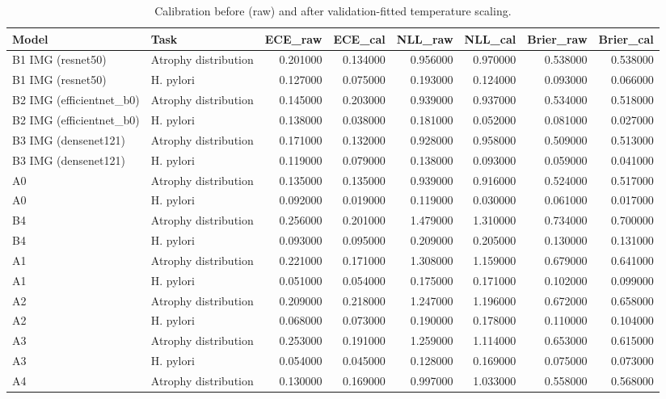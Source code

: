 \begin{table}
\caption{Calibration before (raw) and after validation-fitted temperature scaling.}
\label{tab:table7a_calibration}
\begin{tabular}{llrrrrrr}
\toprule
Model & Task & ECE\_raw & ECE\_cal & NLL\_raw & NLL\_cal & Brier\_raw & Brier\_cal \\
\midrule
B1 IMG (resnet50) & Atrophy distribution & 0.201000 & 0.134000 & 0.956000 & 0.970000 & 0.538000 & 0.538000 \\
B1 IMG (resnet50) & H. pylori & 0.127000 & 0.075000 & 0.193000 & 0.124000 & 0.093000 & 0.066000 \\
B2 IMG (efficientnet\_b0) & Atrophy distribution & 0.145000 & 0.203000 & 0.939000 & 0.937000 & 0.534000 & 0.518000 \\
B2 IMG (efficientnet\_b0) & H. pylori & 0.138000 & 0.038000 & 0.181000 & 0.052000 & 0.081000 & 0.027000 \\
B3 IMG (densenet121) & Atrophy distribution & 0.171000 & 0.132000 & 0.928000 & 0.958000 & 0.509000 & 0.513000 \\
B3 IMG (densenet121) & H. pylori & 0.119000 & 0.079000 & 0.138000 & 0.093000 & 0.059000 & 0.041000 \\
A0 & Atrophy distribution & 0.135000 & 0.135000 & 0.939000 & 0.916000 & 0.524000 & 0.517000 \\
A0 & H. pylori & 0.092000 & 0.019000 & 0.119000 & 0.030000 & 0.061000 & 0.017000 \\
B4 & Atrophy distribution & 0.256000 & 0.201000 & 1.479000 & 1.310000 & 0.734000 & 0.700000 \\
B4 & H. pylori & 0.093000 & 0.095000 & 0.209000 & 0.205000 & 0.130000 & 0.131000 \\
A1 & Atrophy distribution & 0.221000 & 0.171000 & 1.308000 & 1.159000 & 0.679000 & 0.641000 \\
A1 & H. pylori & 0.051000 & 0.054000 & 0.175000 & 0.171000 & 0.102000 & 0.099000 \\
A2 & Atrophy distribution & 0.209000 & 0.218000 & 1.247000 & 1.196000 & 0.672000 & 0.658000 \\
A2 & H. pylori & 0.068000 & 0.073000 & 0.190000 & 0.178000 & 0.110000 & 0.104000 \\
A3 & Atrophy distribution & 0.253000 & 0.191000 & 1.259000 & 1.114000 & 0.653000 & 0.615000 \\
A3 & H. pylori & 0.054000 & 0.045000 & 0.128000 & 0.169000 & 0.075000 & 0.073000 \\
A4 & Atrophy distribution & 0.130000 & 0.169000 & 0.997000 & 1.033000 & 0.558000 & 0.568000 \\

\end{tabular}
\end{table}
